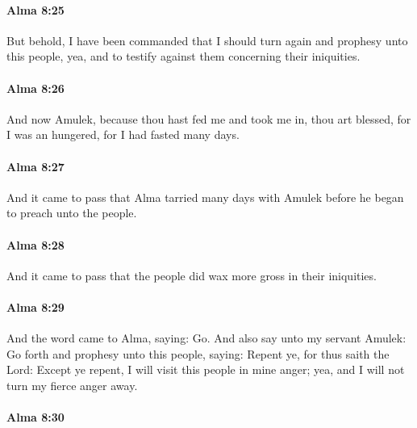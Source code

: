 		\paragraph{Alma 8:25} %
			\label{ALMA-8-25}

			But behold, I have been commanded
			that I should turn again and prophesy unto this people,
			yea, and to testify against them concerning their iniquities.

		\paragraph{Alma 8:26} %
			\label{ALMA-8-26}

			And now Amulek,
			because thou hast fed me and took me in,
			thou art blessed,
			for I was an hungered,
			for I had fasted many days.

		\paragraph{Alma 8:27} %
			\label{ALMA-8-27}

			And it came to pass that Alma tarried many days with Amulek
			before he began to preach unto the people.

		\paragraph{Alma 8:28} %
			\label{ALMA-8-28}

			And it came to pass that the people did wax more gross in their iniquities.

		\paragraph{Alma 8:29} %
			\label{ALMA-8-29}

			And the word came to Alma, saying: Go.
			And also say unto my servant Amulek:
			Go forth and prophesy unto this people, saying:
			Repent ye,
			for thus saith the Lord:
			Except ye repent, I will visit this people in mine anger;
			yea, and I will not turn my fierce anger away.

		\paragraph{Alma 8:30} %
			\label{ALMA-8-30}

